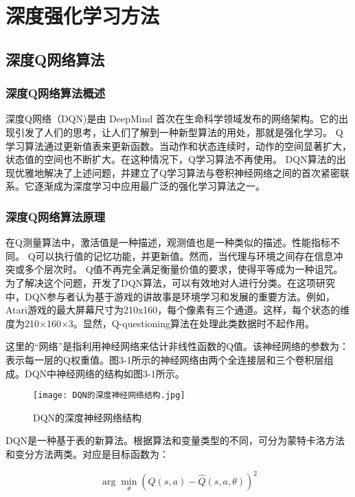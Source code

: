 \chapter{深度强化学习方法}

\section{深度Q网络算法 }

\subsection{深度Q网络算法概述 }

深度Q网络（DQN)\cite{mnih2015human}是由 DeepMind 首次在生命科学领域发布的网络架构。它的出现引发了人们的思考，让人们了解到一种新型算法的用处，那就是强化学习。 Q学习算法通过更新值表来更新函数。当动作和状态连续时，动作的空间显著扩大，状态值的空间也不断扩大。在这种情况下，Q学习算法不再使用。 DQN算法的出现优雅地解决了上述问题，并建立了Q学习算法与卷积神经网络之间的首次紧密联系。它逐渐成为深度学习中应用最广泛的强化学习算法之一。

\subsection{深度Q网络算法原理 }

在Q测量算法中，激活值是一种描述，观测值也是一种类似的描述。性能指标不同。 Q可以执行值的记忆功能，并更新值。然而，当代理与环境之间存在信息冲突或多个层次时。 Q值不再完全满足衡量价值的要求，使得平等成为一种诅咒。为了解决这个问题，开发了DQN算法，可以有效地对人进行分类。在这项研究中，DQN参与者认为基于游戏的讲故事是环境学习和发展的重要方法。例如，Atari游戏的最大屏幕尺寸为210x160，每个像素有三个通道。这样，每个状态的维度为210×160×3。显然，Q-questioning算法在处理此类数据时不起作用。

这里的“网络”是指利用神经网络来估计非线性函数的Q值。该神经网络的参数为： 表示每一层的Q权重值。图3-1所示的神经网络由两个全连接层和三个卷积层组成。DQN中神经网络的结构如图3-1所示。

\begin{figure}[hbt]
	\centering
	\texttt{[image: DQN的深度神经网络结构.jpg]}
	\caption{DQN的深度神经网络结构}
	\label{f.example}
\end{figure}

DQN是一种基于表的新算法。根据算法和变量类型的不同，可分为蒙特卡洛方法和变分方法两类。对应是目标函数为：

\begin{equation}
	\arg\min_{\theta} \left( Q(s,a) - \hat{Q}(s,a,\theta) \right)^2
\end{equation}

